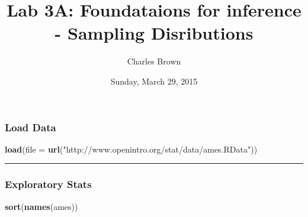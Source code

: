 \documentclass[]{article}
\title{Lab 3A: Foundataions for inference - Sampling Disributions}
\author{Charles Brown}
\date{Sunday, March 29, 2015}
\newenvironment{Shaded}{\begin{snugshade}}{\end{snugshade}}
\newcommand{\KeywordTok}[1]{\textcolor[rgb]{0.13,0.29,0.53}{\textbf{{#1}}}}
\newcommand{\DataTypeTok}[1]{\textcolor[rgb]{0.13,0.29,0.53}{{#1}}}
\newcommand{\StringTok}[1]{\textcolor[rgb]{0.31,0.60,0.02}{{#1}}}
\newcommand{\NormalTok}[1]{{#1}}
\begin{document}
\maketitle


{
\hypersetup{linkcolor=black}
\setcounter{tocdepth}{2}
\tableofcontents
}
\subsubsection{Load Data}\label{load-data}

\begin{Shaded}
\begin{Highlighting}[]
\KeywordTok{load}\NormalTok{(}\DataTypeTok{file =} \KeywordTok{url}\NormalTok{(}\StringTok{"http://www.openintro.org/stat/data/ames.RData"}\NormalTok{))}
\end{Highlighting}
\end{Shaded}

\begin{center}\rule{0.5\linewidth}{\linethickness}\end{center}

\subsubsection{Exploratory Stats}\label{exploratory-stats}

\begin{Shaded}
\begin{Highlighting}[]
\KeywordTok{sort}\NormalTok{(}\KeywordTok{names}\NormalTok{(ames))}
\end{Highlighting}
\end{Shaded}
\end{document}
